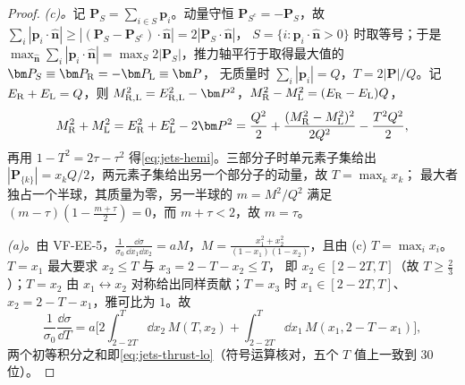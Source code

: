 \begin{proof}
\emph{(c)。}记 $\bm P_S=\sum_{i\in S}\bm p_i$。动量守恒 $\bm P_{S^c}=-\bm P_S$，故 $\sum_i|\bm p_i\cdot\hat{\bm n}|\ge|(\bm P_S-\bm P_{S^c})\cdot\hat{\bm n}|=2|\bm P_S\cdot\hat{\bm n}|$，
$S=\{i:\bm p_i\cdot\hat{\bm n}>0\}$ 时取等号；于是 $\max_{\hat{\bm n}}\sum_i|\bm p_i\cdot\hat{\bm n}|=\max_S2|\bm P_S|$，推力轴平行于取得最大值的 $\bm P_S\equiv\bm P_{\rm R}=-\bm P_{\rm L}\equiv\bm P$，
无质量时 $\sum_i|\bm p_i|=Q$，$T=2|\bm P|/Q$。记 $E_{\rm R}+E_{\rm L}=Q$，则 $M_{\rm R,L}^2=E_{\rm R,L}^2-\bm P^2$，$M_{\rm R}^2-M_{\rm L}^2=(E_{\rm R}-E_{\rm L})Q$，
\[
M_{\rm R}^2+M_{\rm L}^2=E_{\rm R}^2+E_{\rm L}^2-2\bm P^2=\frac{Q^2}{2}+\frac{(M_{\rm R}^2-M_{\rm L}^2)^2}{2Q^2}-\frac{T^2Q^2}{2},
\]
再用 $1-T^2=2\tau-\tau^2$ 得\cref{eq:jets-hemi}。三部分子时单元素子集给出 $|\bm P_{\{k\}}|=x_kQ/2$，两元素子集给出另一个部分子的动量，故 $T=\max_kx_k$；
最大者独占一个半球，其质量为零，另一半球的 $m=M^2/Q^2$ 满足 $(m-\tau)(1-\frac{m+\tau}{2})=0$，而 $m+\tau<2$，故 $m=\tau$。

\emph{(a)。}由 VF-EE-5，$\frac1{\sigma_0}\frac{\dd\sigma}{\dd x_1\dd x_2}=aM$，$M=\frac{x_1^2+x_2^2}{(1-x_1)(1-x_2)}$，且由 (c) $T=\max_ix_i$。$T=x_1$ 最大要求 $x_2\le T$ 与 $x_3=2-T-x_2\le T$，
即 $x_2\in[2-2T,T]$（故 $T\ge\frac23$）；$T=x_2$ 由 $x_1\leftrightarrow x_2$ 对称给出同样贡献；$T=x_3$ 时 $x_1\in[2-2T,T]$、$x_2=2-T-x_1$，雅可比为 $1$。故
\begin{equation}\label{eq:jets-thrust-regions}
\frac{1}{\sigma_0}\frac{\dd\sigma}{\dd T}=a\Big[2\int_{2-2T}^{T}\dd x_2\,M(T,x_2)+\int_{2-2T}^{T}\dd x_1\,M(x_1,2-T-x_1)\Big],
\end{equation}
两个初等积分之和即\cref{eq:jets-thrust-lo}（符号运算核对，五个 $T$ 值上一致到 30 位）。


\end{proof}
